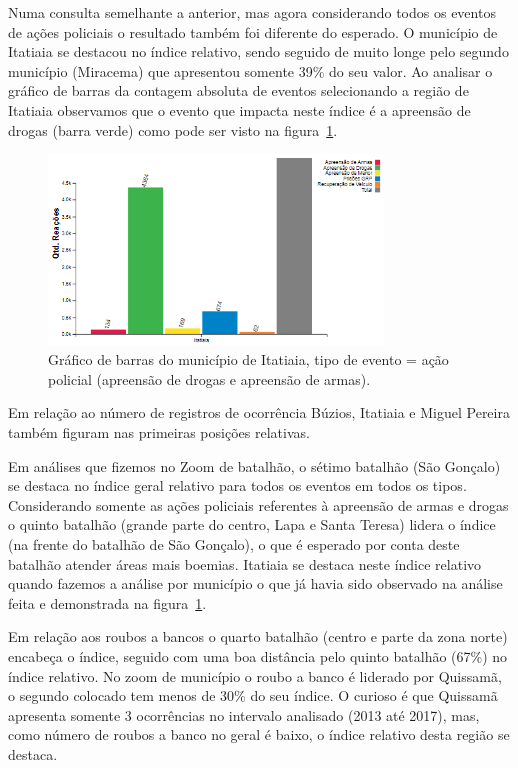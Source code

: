 \documentclass[10pt,conference]{IEEEtran}
\begin{document}
Numa consulta semelhante a anterior, mas agora considerando todos os eventos de ações policiais o resultado também foi diferente do esperado. O município de Itatiaia se destacou no índice relativo, sendo seguido de muito longe pelo segundo município (Miracema) que apresentou somente 39\% do seu valor. Ao analisar o gráfico de barras da contagem absoluta de eventos selecionando a região de Itatiaia observamos que o evento que impacta neste índice é a apreensão de drogas (barra verde) como pode ser visto na figura~\ref{fig_barraDrogasItatiaia}.

\begin{figure}[!t]
\centering
\includegraphics[width=3.5in]{acaoPolicialDrogasItatiaia.png}
\caption{Gráfico de barras do município de Itatiaia, tipo de evento = ação policial (apreensão de drogas e apreensão de armas).}
\label{fig_barraDrogasItatiaia}
\end{figure}

Em relação ao número de registros de ocorrência Búzios, Itatiaia e Miguel Pereira também figuram nas primeiras posições relativas.

Em análises que fizemos no Zoom de batalhão, o sétimo batalhão (São Gonçalo) se destaca no índice geral relativo para todos os eventos em todos os tipos. Considerando somente as ações policiais referentes à apreensão de armas e drogas o quinto batalhão (grande parte do centro, Lapa e Santa Teresa) lidera o índice (na frente do batalhão de São Gonçalo), o que é esperado por conta deste batalhão atender áreas mais boemias. Itatiaia se destaca neste índice relativo quando fazemos a análise por município o que já havia sido observado na análise feita e demonstrada na figura~\ref{fig_barraDrogasItatiaia}. 

Em relação aos roubos a bancos o quarto batalhão (centro e parte da zona norte) encabeça o índice, seguido com uma boa distância pelo quinto batalhão (67\%) no índice relativo. No zoom de município o roubo a banco é liderado por Quissamã, o segundo colocado tem menos de 30\% do seu índice. O curioso é que Quissamã apresenta somente 3 ocorrências no intervalo analisado (2013 até 2017), mas, como número de roubos a banco no geral é baixo, o índice relativo desta região se destaca.
\end{document}
